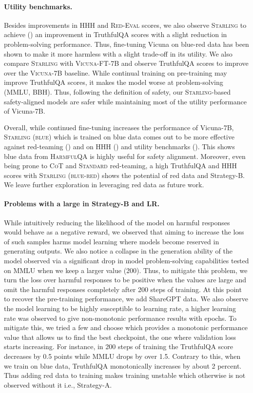 \documentclass{article}
\newcommand{\starlingemoji}{\textsc{Starling}}
\newcommand{\dataset}{\textsc{HarmfulQA}}
\newcommand{\evaluation}{\textsc{Red-Eval}}
\begin{document}
{\paragraph{Utility benchmarks.} Besides improvements in HHH and \evaluation{} scores, we also observe \starlingemoji{} to achieve () an improvement in TruthfulQA scores with a slight reduction in problem-solving performance. Thus, fine-tuning Vicuna on blue-red data has been shown to make it more harmless with a slight trade-off in its utility. We also compare \starlingemoji{} with \textsc{Vicuna-FT-7B} and observe TruthfulQA scores to improve over the \textsc{Vicuna-7B} baseline. While continual training on pre-training may improve TruthfulQA scores, it makes the model worse at problem-solving (MMLU, BBH). Thus, following the definition of safety, our \starlingemoji{}-based safety-aligned models are safer while maintaining most of the utility performance of Vicuna-7B. 

Overall, while continued fine-tuning increases the performance of Vicuna-7B, \starlingemoji{} \textsc{(blue)} which is trained on blue data comes out to be more effective against red-teaming () and on HHH () and utility benchmarks (). This shows blue data from \dataset{} is highly useful for safety alignment. Moreover, even being prone to \textsc{CoT} and \textsc{Standard} red-teaming, a high TruthfulQA and HHH scores with \starlingemoji{} \textsc{(blue-red)} shows the potential of red data and Strategy-B. We leave further exploration in leveraging red data as future work.

\paragraph{Problems with a large  in Strategy-B and LR.} While intuitively reducing the likelihood of the model on harmful responses would behave as a negative reward, we observed that aiming to increase the loss of such samples harms model learning where models become reserved in generating outputs. We also notice a collapse in the generation ability of the model observed via a significant drop in model problem-solving capabilities tested on MMLU when we keep a larger  value (200). Thus, to mitigate this problem, we turn the loss over harmful responses to be positive when the values are large and omit the harmful responses completely after 200 steps of training. At this point to recover the pre-training performance, we add ShareGPT data. We also observe the model learning to be highly susceptible to learning rate, a higher learning rate was observed to give non-monotonic performance results with epochs. To mitigate this, we tried a few and choose  which provides a monotonic performance value that allows us to find the best checkpoint, the one where validation loss starts increasing. For instance, in 200 steps of training the TruthfulQA score decreases by 0.5 points while MMLU drops by over 1.5. Contrary to this, when we train on blue data, TruthfulQA monotonically increases by about 2 percent. Thus adding red data to training makes training unstable which otherwise is not observed without it i.e., Strategy-A.






}
\end{document}
